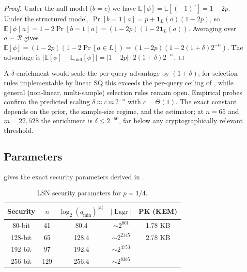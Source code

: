 \documentclass[11pt,a4paper]{article}
\theoremstyle{plain}
\theoremstyle{definition}
\newcommand{\E}{\mathbb{E}}
\DeclareMathOperator{\Lagr}{Lagr}
\begin{document}
\begin{proof}
Under the null model ($b=e$) we have $\E[\phi] = \E[(-1)^e] = 1-2p$. Under the structured model, $\Pr[b=1 \mid a] = p + \mathbf{1}_L(a)(1-2p)$, so $\E[\phi \mid a] = 1-2\Pr[b=1 \mid a] = (1-2p)(1-2\mathbf{1}_L(a))$. Averaging over $a \sim \mathcal{R}$ gives $\E[\phi] = (1-2p)(1-2\Pr[a \in L]) = (1-2p)(1-2(1+\delta)2^{-n})$. The advantage is $|\E[\phi]-\E_{\text{null}}[\phi]| = |1-2p| \cdot 2(1+\delta)2^{-n}$.
\end{proof}

A $\delta$-enrichment would scale the per-query advantage by $(1+\delta)$; for selection rules implementable by linear SQ this exceeds the per-query ceiling of , while general (non-linear, multi-sample) selection rules remain open.  Empirical probes confirm the predicted scaling $\delta \approx c\,m\,2^{-n}$ with $c=\Theta(1)$.  The exact constant depends on the prior, the sample-size regime, and the estimator; at $n=65$ and $m=22{,}528$ the enrichment is $\delta \le 2^{-50}$, far below any cryptographically relevant threshold.

\subsection{Parameters}
\label{subsec:parameters}

 gives the exact security parameters derived in .

\begin{table}[ht]
\centering
\caption{LSN security parameters for $p=1/4$.}
\label{tab:parameters}
\begin{tabular}{@{}ccccc@{}}
\hline
Security & $n$ & $\log_2(q_{\min})^{\text{(a)}}$ & $|\Lagr|$ & PK (KEM) \\
\hline
80-bit  & 41  & 80.4  & $\sim 2^{861}$  & 1.78 KB \\
128-bit & 65  & 128.4 & $\sim 2^{2145}$ & 2.78 KB \\
192-bit & 97  & 192.4 & $\sim 2^{4753}$ & --- \\
256-bit & 129 & 256.4 & $\sim 2^{8385}$ & --- \\
\hline
\end{tabular}
\vspace{4pt}
\end{table}
\end{document}
